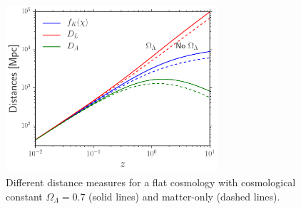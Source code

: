 \begin{figure} %
\centering %
\includegraphics[width=0.7\textwidth]{Chapter1/Images/dists}
\caption{Different distance measures for a flat cosmology with cosmological constant $\Omega_{\Lambda}
=0.7$ (solid lines) and matter-only (dashed lines). \label{fig:dist}}
\end{figure}

